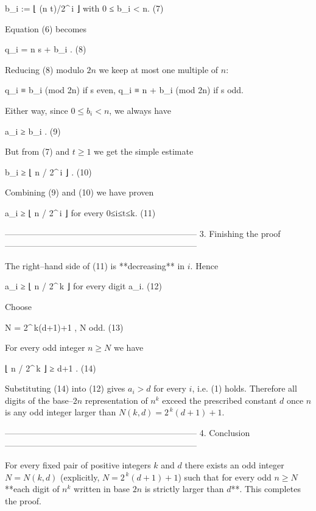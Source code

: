               b_i := ⌊ (n t)/2^{\,i} ⌋            with 0 ≤ b_i < n.  (7)

Equation (6) becomes

              q_i = n s + b_i .                                    (8)

Reducing (8) modulo $2n$ we keep at most one multiple of $n$:

       q_i  ≡                b_i            (mod 2n)  if s even,
       q_i  ≡     n +        b_i            (mod 2n)  if s odd.

Either way, since $0\le b_i<n$, we always have

                     a_i  ≥  b_i .                                  (9)

But from (7) and $t\ge 1$ we get the simple estimate

                     b_i  ≥  ⌊ n / 2^{\,i} ⌋ .                      (10)

Combining (9) and (10) we have proven

          a_i ≥ ⌊ n / 2^{\,i} ⌋      for every 0≤i≤t≤k.            (11)

--------------------------------------------------------------------
3.  Finishing the proof
--------------------------------------------------------------------

The right–hand side of (11) is **decreasing** in $i$.  Hence

      a_i ≥ ⌊ n / 2^{\,k} ⌋     for every digit a_i.               (12)

Choose  

                 N = 2^{\,k}(d+1)+1 ,   N odd.                     (13)

For every odd integer $n\ge N$ we have  

                 ⌊ n / 2^{\,k} ⌋  ≥  d+1 .                         (14)

Substituting (14) into (12) gives $a_i>d$ for every $i$, i.e. (1)
holds.  Therefore all digits of the base–$2n$ representation of
$n^{k}$ exceed the prescribed constant $d$ once $n$ is any odd integer
larger than $N(k,d)=2^{\,k}(d+1)+1$.

--------------------------------------------------------------------
4.  Conclusion
--------------------------------------------------------------------

For every fixed pair of positive integers $k$ and $d$ there exists an
odd integer $N=N(k,d)$ (explicitly, $N=2^{\,k}(d+1)+1$) such that for
every odd $n\ge N$ **each digit of $n^{k}$ written in base $2n$ is
strictly larger than $d$**.  This completes the proof.